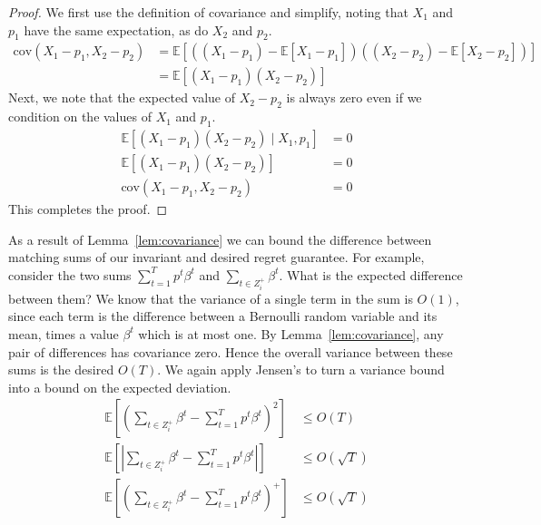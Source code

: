 \documentclass[final,12pt]{colt2018}
\newcommand{\E}{\mathbb{E}}
\newcommand{\cov}{\text{cov}}
\newcommand{\Yes}[1][i]{Z^+_{#1}}
\begin{document}
\begin{proof}
  We first use the definition of covariance and simplify, noting that $X_1$ and
  $p_1$ have the same expectation, as do $X_2$ and $p_2$.
  \begin{align*}
    \cov(X_1 - p_1, X_2 - p_2)
      &=
      \E \left[
        \left( (X_1 - p_1) - \E \left[ X_1 - p_1 \right] \right)
        \left( (X_2 - p_2) - \E \left[ X_2 - p_2 \right] \right)
      \right] \\
      &=
      \E \left[
        \left( X_1 - p_1 \right)
        \left( X_2 - p_2 \right)
      \right]
  \end{align*}
  Next, we note that the expected value of $X_2 - p_2$ is always zero even if we
  condition on the values of $X_1$ and $p_1$.
  \begin{align*}
    \E \left[
      \left( X_1 - p_1 \right)
      \left( X_2 - p_2 \right)
      \mid
      X_1, p_1
    \right] &= 0 \\
    \E \left[
      \left( X_1 - p_1 \right)
      \left( X_2 - p_2 \right)
    \right] &= 0 \\
    \cov(X_1 - p_1, X_2 - p_2) &= 0
  \end{align*}
  This completes the proof.
\end{proof}

As a result of Lemma~\ref{lem:covariance} we can bound the difference between
matching sums of our invariant and desired regret guarantee. For example,
consider the two sums $\sum_{t=1}^T p^t \beta^t$ and
$\sum_{t \in \Yes} \beta^t$. What is the expected difference between them?
We know that the variance of a single term in the sum is $O(1)$, since each term
is the difference between a Bernoulli random variable and its mean, times a
value $\beta^t$ which is at most one. By Lemma~\ref{lem:covariance}, any pair
of differences has covariance zero. Hence the overall variance between these
sums is the desired $O(T)$. We again apply Jensen's to turn a variance
bound into a bound on the expected deviation.
\begin{align*}
  \E \left[
    \left(
      \sum_{t \in \Yes} \beta^t - \sum_{t=1}^T p^t \beta^t
    \right)^2
  \right] &\le O(T) \\
  \E \left[
    \left \lvert
      \sum_{t \in \Yes} \beta^t - \sum_{t=1}^T p^t \beta^t
    \right \rvert
  \right] &\le O(\sqrt{T}) \\
  \E \left[
    \left(
      \sum_{t \in \Yes} \beta^t - \sum_{t=1}^T p^t \beta^t
    \right)^+
  \right] &\le O(\sqrt{T})
\end{align*}
\end{document}
